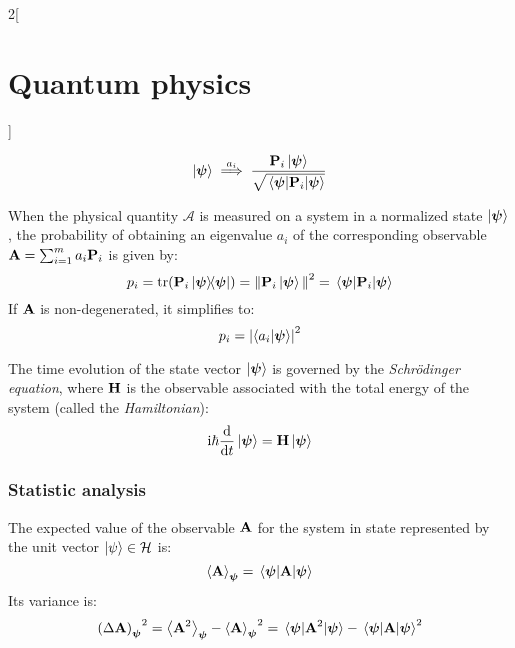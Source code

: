 \documentclass[../../../main.tex]{subfiles}
\begin{document}
\begin{multicols}{2}[\section{Quantum physics}]
\begin{definition}
    $$\ket{\boldsymbol{\mathrm{\psi}}}\overset{a_i}{\implies}\frac{\boldsymbol{\mathrm{P}}_i\ket{\boldsymbol{\mathrm{\psi}}}}{\sqrt{\mel{\boldsymbol{\mathrm{\psi}}}{\boldsymbol{\mathrm{P}}_i}{\boldsymbol{\mathrm{\psi}}}}}$$
  \end{definition}
  \begin{definition}[Postulate IV]
    When the physical quantity $\mathcal{A}$ is measured on a system in a normalized state $\ket{\boldsymbol{\mathrm{\psi}}}$, the probability of obtaining an eigenvalue $a_i$ of the corresponding observable $\boldsymbol{\mathrm{A}}=\sum_{i=1}^ma_i\boldsymbol{\mathrm{P}}_i$ is given by:
    $$p_i=\trace(\vf{P}_i\dyad{\vf\psi}{\vf\psi})={\norm{\vf{P}_i\ket{\vf\psi}}}^2=\mel{\vf\psi}{\vf{P}_i}{\vf\psi}$$
    If $\boldsymbol{\mathrm{A}}$ is non-degenerated, it simplifies to: $$p_i={\abs{\braket{a_i}{\boldsymbol{\mathrm{\psi}}}}}^2$$
  \end{definition}
  \begin{definition}[Postulate V]
    The time evolution of the state vector $\ket{\boldsymbol{\mathrm{\psi}}}$ is governed by the \emph{Schrödinger equation}, where $\boldsymbol{\mathrm{H}}$ is the observable associated with the total energy of the system (called the \emph{Hamiltonian}): $$\mathrm{i} \hbar\dv{}{t}\ket{\boldsymbol{\mathrm{\psi}}}=\boldsymbol{\mathrm{H}}\ket{\boldsymbol{\mathrm{\psi}}}$$
  \end{definition}
  \subsubsection{Statistic analysis}
  \begin{proposition}
    The expected value of the observable $\boldsymbol{\mathrm{A}}$ for the system in state represented by the unit vector $\ket{\psi}\in\mathcal{H}$ is: $$\ev{\vf{A}}_{\vf\psi}=\ev{\vf{A}}{\vf\psi}$$
    Its variance is: $${{(\Delta\vf{A})}_{\vf\psi}}^2=\ev{\vf{A}^2}_{\vf\psi}-{\ev{\vf{A}}_{\vf\psi}}^2=\ev{\vf{A}^2}{\vf\psi}-\ev{\vf{A}}{\vf\psi}^2$$
  \end{proposition}
\end{multicols}
\end{document}
